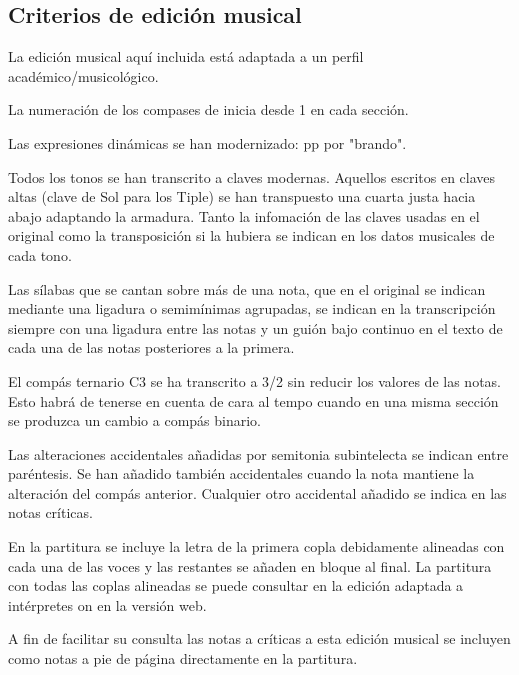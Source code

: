 \subsection*{Criterios de edición musical}
\noindent La edición musical aquí incluida está adaptada a un perfil académico/musicológico.

\noindent La numeración de los compases de inicia desde 1 en cada sección.

\noindent Las expresiones dinámicas se han modernizado: pp por "brando".

\noindent Todos los tonos se han transcrito a claves modernas. Aquellos escritos en claves altas (clave de Sol para los Tiple) se han transpuesto una cuarta justa hacia abajo adaptando la armadura. Tanto la infomación de las claves usadas en el original como la transposición si la hubiera se indican en los datos musicales de cada tono.

\noindent Las sílabas que se cantan sobre más de una nota, que en el original se indican mediante una ligadura o semimínimas agrupadas, se indican en la transcripción siempre con una ligadura entre las notas y un guión bajo continuo en el texto de cada una de las notas posteriores a la primera. 

\noindent El compás ternario C3 se ha transcrito a 3/2 sin reducir los valores de las notas. Esto habrá de tenerse en cuenta de cara al tempo cuando en una misma sección se produzca un cambio a compás binario.

\noindent Las alteraciones accidentales añadidas por semitonia subintelecta se indican entre paréntesis. Se han añadido también accidentales cuando la nota mantiene la alteración del compás anterior. Cualquier otro accidental añadido se indica en las notas críticas.

\noindent En la partitura se incluye la letra de la primera copla debidamente alineadas con cada una de las voces y las restantes se añaden en bloque al final. La partitura con todas las coplas alineadas se puede consultar en la edición adaptada a intérpretes on en la versión web. 

\noindent A fin de facilitar su consulta las notas a críticas a esta edición musical se incluyen como notas a pie de página directamente en la partitura.
